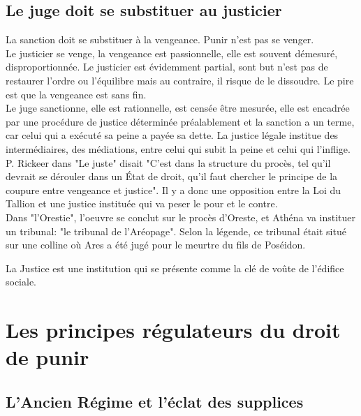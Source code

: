 \documentclass[10pt, a4paper, openany]{book}
\begin{document}
\subsection{Le juge doit se substituer au justicier}

La sanction doit se substituer à la vengeance. Punir n'est pas se venger. \\
Le justicier se venge, la vengeance est passionnelle, elle est souvent démesuré, disproportionnée. Le justicier est évidemment partial, sont but n'est pas de restaurer l'ordre ou l'équilibre mais au contraire, il risque de le dissoudre. Le pire est que la vengeance est sans fin. \\
Le juge sanctionne, elle est rationnelle, est censée être mesurée, elle est encadrée par une procédure de justice déterminée préalablement et la sanction a un terme, car celui qui a exécuté sa peine a payée sa dette. La justice légale institue des intermédiaires, des médiations, entre celui qui subit la peine et celui qui l'inflige. \\
P. Rickeer dans "Le juste" disait "C'est dans la structure du procès, tel qu'il devrait se dérouler dans un État de droit, qu'il faut chercher le principe de la coupure entre vengeance et justice". Il y a donc une opposition entre la Loi du Tallion et une justice instituée qui va peser le pour et le contre. \\
Dans "l'Orestie", l'oeuvre se conclut sur le procès d'Oreste, et Athéna va instituer un tribunal: "le tribunal de l'Aréopage". Selon la légende, ce tribunal était situé sur une colline où Ares a été jugé pour le meurtre du fils de Poséidon. 


La Justice est une institution qui se présente comme la clé de voûte de l'édifice sociale. 

\section{Les principes régulateurs du droit de punir}

\subsection{L'Ancien Régime et l'éclat des supplices}
\end{document}
